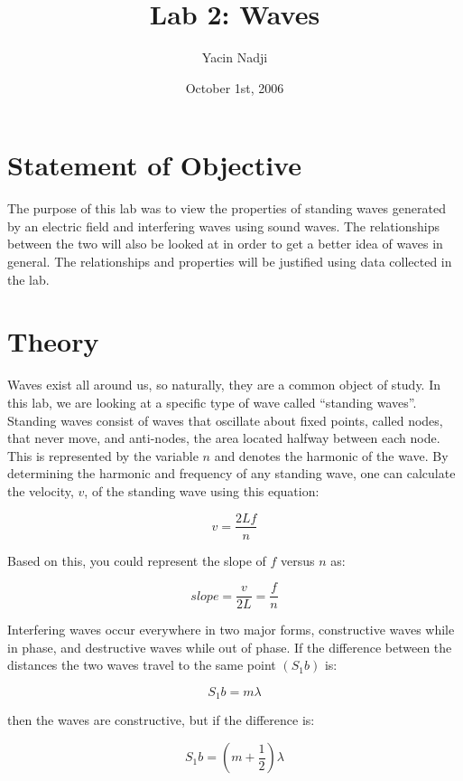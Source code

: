 \documentclass[titlepage]{article}
\title{Lab 2: Waves}
\author{Yacin Nadji}
\date{October 1st, 2006}
\begin{document}
\maketitle

\section{Statement of Objective}\label{sec:obj}
The purpose of this lab was to view the properties of standing waves generated by an electric field and interfering waves using sound waves. The relationships between the two will also be looked at in order to get a better idea of waves in general. The relationships and properties will be justified using data collected in the lab.

\section{Theory}\label{sec:theory}
Waves exist all around us, so naturally, they are a common object of study. In this lab, we are looking at a specific type of wave called ``standing waves''. Standing waves consist of waves that oscillate about fixed points, called nodes, that never move, and anti-nodes, the area located halfway between each node. This is represented by the variable $n$ and denotes the harmonic of the wave. By determining the harmonic and frequency of any standing wave, one can calculate the velocity, $v$, of the standing wave using this equation:

\begin{equation}
	v = \frac{2 L f}{n}
\end{equation}

Based on this, you could represent the slope of $f$ versus $n$ as:

\begin{equation}
	slope = \frac{v}{2L} = \frac{f}{n}
\end{equation}

Interfering waves occur everywhere in two major forms, constructive waves while in phase, and destructive waves while out of phase. If the difference between the distances the two waves travel to the same point $(S_1b)$ is:

\begin{equation}
	S_1b = m \lambda
\end{equation}

then the waves are constructive, but if the difference is:

\begin{equation}
	S_1b = (m + \frac{1}{2}) \lambda
\end{equation}
\end{document}
